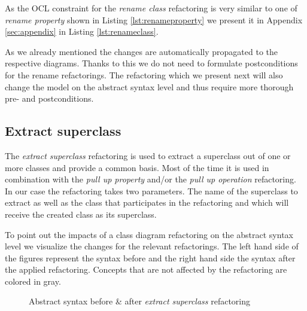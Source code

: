 \documentclass{llncs}
\begin{document}
As the OCL constraint for the \textit{rename class} refactoring is very similar to one of \textit{rename property} shown 
in Listing \ref{lst:renameproperty} we present it in Appendix \ref{sec:appendix} in Listing \ref{lst:renameclass}.

As we already mentioned the changes are automatically propagated to the respective diagrams. Thanks to this we do 
not need to formulate postconditions for the rename refactorings. The refactoring which we present next will also 
change the model on the abstract syntax level and thus require more thorough pre- and postconditions.

\subsection{Extract superclass}
\label{sec:extract}
The \textit{extract superclass} refactoring is used to extract a superclass out of one or more classes and provide 
a common basis. Most of the time it is used in combination with the \textit{pull up property} and/or the \textit{pull 
up operation} refactoring. In our case the refactoring takes two parameters. The name of the superclass to extract as well as
the class that participates in the refactoring and which will receive the created class as its superclass.

To point out the impacts of a class diagram refactoring on the abstract syntax level we visualize the changes for the 
relevant refactorings. The left hand side of the figures represent the syntax before and the right hand side the syntax 
after the applied refactoring. Concepts that are not affected by the refactoring are colored in gray. 

\begin{figure}
 \caption{Abstract syntax before \& after \textit{extract superclass} refactoring}
 \label{fig:extract}
\end{figure}
\end{document}
